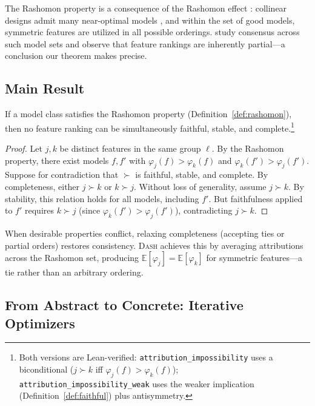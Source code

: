 \documentclass{jmlr}
\newcommand{\E}{\mathbb{E}}
\newcommand{\DASH}{\textsc{Dash}}
\begin{document}
The Rashomon property is a consequence of the Rashomon effect \citep{rudin2024amazing,fisher2019models}: collinear designs admit many near-optimal models \citep{damour2022underspecification}, and within the set of good models, symmetric features are utilized in all possible orderings.
\citet{laberge2023partial} study consensus across such model sets and observe that feature rankings are inherently partial---a conclusion our theorem makes precise.

\subsection{Main Result}
\label{sec:main-result}

\begin{theorem}
\label{thm:impossibility}
If a model class satisfies the Rashomon property (Definition~\ref{def:rashomon}), then no feature ranking can be simultaneously faithful, stable, and complete.\footnote{Both versions are Lean-verified: \texttt{attribution\_impossibility} uses a biconditional ($j \succ k$ iff $\varphi_j(f) > \varphi_k(f)$); \texttt{attribution\_impossibility\_weak} uses the weaker implication (Definition~\ref{def:faithful}) plus antisymmetry.}
\end{theorem}

\begin{proof}
Let $j, k$ be distinct features in the same group $\ell$.
By the Rashomon property, there exist models $f, f'$ with $\varphi_j(f) > \varphi_k(f)$ and $\varphi_k(f') > \varphi_j(f')$.
Suppose for contradiction that $\succ$ is faithful, stable, and complete.
By completeness, either $j \succ k$ or $k \succ j$.
Without loss of generality, assume $j \succ k$.
By stability, this relation holds for all models, including $f'$.
But faithfulness applied to $f'$ requires $k \succ j$ (since $\varphi_k(f') > \varphi_j(f')$), contradicting $j \succ k$.
\end{proof}

When desirable properties conflict, relaxing completeness (accepting ties or partial orders) restores consistency.
\DASH{} achieves this by averaging attributions across the Rashomon set, producing $\E[\varphi_j] = \E[\varphi_k]$ for symmetric features---a tie rather than an arbitrary ordering.

\subsection{From Abstract to Concrete: Iterative Optimizers}
\label{sec:iterative}
\end{document}

